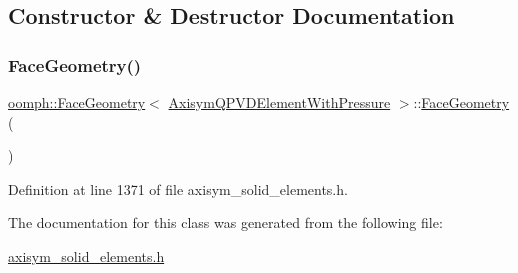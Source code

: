 \subsection{Constructor \& Destructor Documentation}
\mbox{\label{classoomph_1_1FaceGeometry_3_01AxisymQPVDElementWithPressure_01_4_aaf6fde56d56e6aad4dc0bfe60d4bf694}} 
\subsubsection{\texorpdfstring{Face\+Geometry()}{FaceGeometry()}}
{\footnotesize\ttfamily \hyperlink{classoomph_1_1FaceGeometry}{oomph\+::\+Face\+Geometry}$<$ \hyperlink{classoomph_1_1AxisymQPVDElementWithPressure}{Axisym\+Q\+P\+V\+D\+Element\+With\+Pressure} $>$\+::\hyperlink{classoomph_1_1FaceGeometry}{Face\+Geometry} (\begin{DoxyParamCaption}{ }\end{DoxyParamCaption})\hspace{0.3cm}{\ttfamily [inline]}}



Definition at line 1371 of file axisym\+\_\+solid\+\_\+elements.\+h.



The documentation for this class was generated from the following file\+:\begin{DoxyCompactItemize}
\item 
\hyperlink{axisym__solid__elements_8h}{axisym\+\_\+solid\+\_\+elements.\+h}\end{DoxyCompactItemize}
